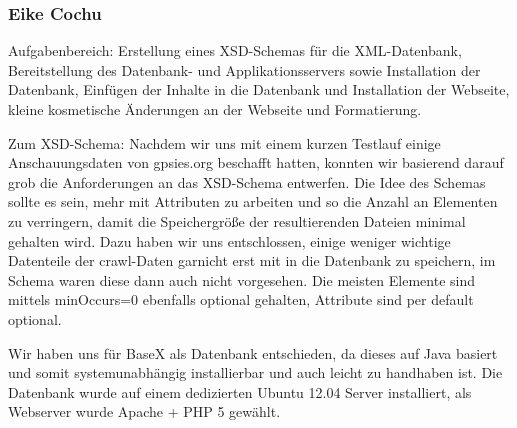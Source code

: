 \subsubsection{Eike Cochu}
Aufgabenbereich: Erstellung eines XSD-Schemas für die XML-Datenbank, Bereitstellung des Datenbank- und Applikationsservers sowie Installation der Datenbank, Einfügen der Inhalte in die Datenbank und Installation der Webseite, kleine kosmetische Änderungen an der Webseite und Formatierung.

Zum XSD-Schema: Nachdem wir uns mit einem kurzen Testlauf einige Anschauungsdaten von gpsies.org beschafft hatten, konnten wir basierend darauf grob die Anforderungen an das XSD-Schema entwerfen. Die Idee des Schemas sollte es sein, mehr mit Attributen zu arbeiten und so die Anzahl an Elementen zu verringern, damit die Speichergröße der resultierenden Dateien minimal gehalten wird. Dazu haben wir uns entschlossen, einige weniger wichtige Datenteile der crawl-Daten garnicht erst mit in die Datenbank zu speichern, im Schema waren diese dann auch nicht vorgesehen. Die meisten Elemente sind mittels minOccurs=0 ebenfalls optional gehalten, Attribute sind per default optional.

Wir haben uns für BaseX als Datenbank entschieden, da dieses auf Java basiert und somit systemunabhängig installierbar und auch leicht zu handhaben ist. Die Datenbank wurde auf einem dedizierten Ubuntu 12.04 Server installiert, als Webserver wurde Apache + PHP 5 gewählt.
